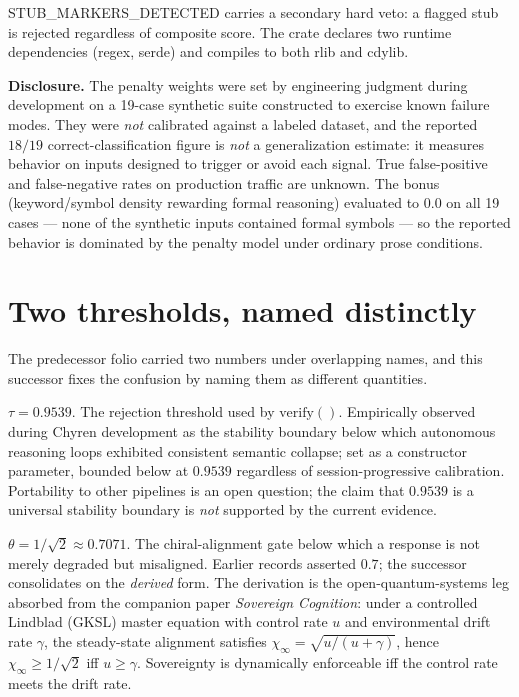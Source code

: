 \documentclass{alienfolio}
\begin{document}
STUB\_MARKERS\_DETECTED carries a secondary hard veto: a flagged stub is
rejected regardless of composite score. The crate declares two runtime
dependencies (regex, serde) and compiles to both rlib and cdylib.

\goldrule
\textbf{Disclosure.} The penalty weights were set by engineering judgment
during development on a 19-case synthetic suite constructed to exercise known
failure modes. They were \emph{not} calibrated against a labeled dataset, and
the reported $18/19$ correct-classification figure is \emph{not} a
generalization estimate: it measures behavior on inputs designed to trigger or
avoid each signal. True false-positive and false-negative rates on production
traffic are unknown. The  bonus (keyword/symbol density
rewarding formal reasoning) evaluated to $0.0$ on all 19 cases --- none of the
synthetic inputs contained formal symbols --- so the reported behavior is
dominated by the penalty model under ordinary prose conditions.

\section{Two thresholds, named distinctly}
The predecessor folio carried two numbers under overlapping names, and this
successor fixes the confusion by naming them as different quantities.

 $\tau = 0.9539$. The rejection threshold used by
$\mathrm{verify()}$. Empirically observed during Chyren development as the
stability boundary below which autonomous reasoning loops exhibited
consistent semantic collapse; set as a constructor parameter, bounded below
at $0.9539$ regardless of session-progressive calibration. Portability to
other pipelines is an open question; the claim that $0.9539$ is a universal
stability boundary is \emph{not} supported by the current evidence.

 $\theta = 1/\sqrt{2} \approx 0.7071$. The
chiral-alignment gate below which a response is not merely degraded but
misaligned. Earlier records asserted $0.7$; the successor consolidates on the
\emph{derived} form. The derivation is the open-quantum-systems leg absorbed
from the companion paper \emph{Sovereign Cognition}: under a controlled
Lindblad (GKSL) master equation with control rate $u$ and environmental drift
rate $\gamma$, the steady-state alignment satisfies
$\chi_\infty = \sqrt{u/(u+\gamma)}$, hence $\chi_\infty \geq 1/\sqrt{2}$ iff
$u \geq \gamma$. Sovereignty is dynamically enforceable iff the control rate
meets the drift rate. 
\end{document}
